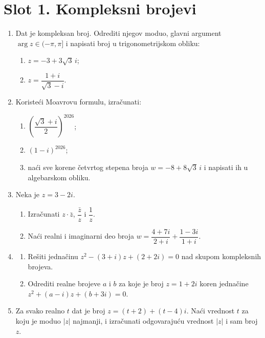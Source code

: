 


\section*{Slot 1. Kompleksni brojevi}
\begin{enumerate}[label=\arabic*.]
\item Dat je kompleksan broj. Odrediti njegov moduo, glavni argument $\arg z\in(-\pi,\pi]$ i napisati broj u trigonometrijskom obliku:
\begin{enumerate}[label=\alph*)]
\item $z=-3+3\sqrt{3}\,i$;
\item $z=\dfrac{1+i}{\sqrt{3}-i}$.
\end{enumerate}

\item Koristeći Moavrovu formulu, izračunati:
\begin{enumerate}[label=\alph*)]
\item $\left(\dfrac{\sqrt{3}+i}{2}\right)^{2026}$;
\item $(1-i)^{2026}$;
\item naći sve korene četvrtog stepena broja $w=-8+8\sqrt{3}\,i$ i napisati ih u algebarskom obliku.
\end{enumerate}

\item Neka je $z=3-2i$.
\begin{enumerate}[label=\alph*)]
\item Izračunati $z\cdot\bar z$, $\dfrac{\bar z}{z}$ i $\dfrac{1}{z}$.
\item Naći realni i imaginarni deo broja $w=\dfrac{4+7i}{2+i}+\dfrac{1-3i}{1+i}.$
\end{enumerate}

\item \begin{enumerate}[label=\alph*)]
\item Rešiti jednačinu $z^2-(3+i)z+(2+2i)=0$ nad skupom kompleksnih brojeva.
\item Odrediti realne brojeve $a$ i $b$ za koje je broj $z=1+2i$ koren jednačine $z^2+(a-i)z+(b+3i)=0.$
\end{enumerate}

\item Za svako realno $t$ dat je broj $z=(t+2)+(t-4)i.$ Naći vrednost $t$ za koju je moduo $|z|$ najmanji, i izračunati odgovarajuću vrednost $|z|$ i sam broj $z$.
\end{enumerate}
\clearpage
